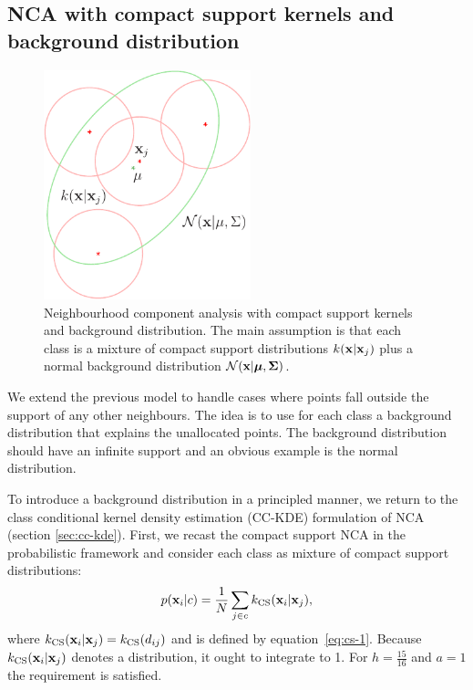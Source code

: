	
\subsection{NCA with compact support kernels and background distribution}
\label{sec:nca-cs-back}

	\begin{figure}
	  \centering\includegraphics[width=6cm]{images/nca-cs-back}
	  \caption[NCA with compact support kernels and normal background distribution]{Neighbourhood component analysis with compact support kernels and
	background distribution. The main assumption is that each class is a mixture of
	compact support distributions $k(\mathbf{x}|\mathbf{x}_j)$ plus a normal background
	distribution $\mathcal{N}(\mathbf{x}|\mbox{\boldmath $\mu$},\mbox{\boldmath $\Sigma$})$.}
	  \label{fig:cs-back}
	\end{figure}
	
	We extend the previous model to handle cases where points fall outside the support of any other neighbours. The idea is to use  for each class a background distribution that explains the unallocated points. The background distribution should have an infinite support and an obvious example is the normal distribution.
	
	To introduce a background distribution in a principled manner, we return to the class conditional kernel density estimation (CC-KDE) formulation of NCA (section \ref{sec:cc-kde}). First, we recast the compact support NCA in the probabilistic framework and consider each class as mixture of compact support distributions: 
	\begin{align}
		p(\mathbf{x}_i|c) = \frac{1}{N}\sum_{j\in c} k_\text{CS}(\mathbf{x}_i|\mathbf{x}_j),
	\end{align}
	where $k_\text{CS}(\mathbf{x}_i|\mathbf{x}_j) = k_\text{CS}(d_{ij})$ and is defined by equation~\eqref{eq:cs-1}. Because $k_\text{CS}(\mathbf{x}_i|\mathbf{x}_j)$ denotes a distribution, it ought to integrate to 1. For $h=\frac{15}{16}$ and $a=1$ the requirement is satisfied.
	
